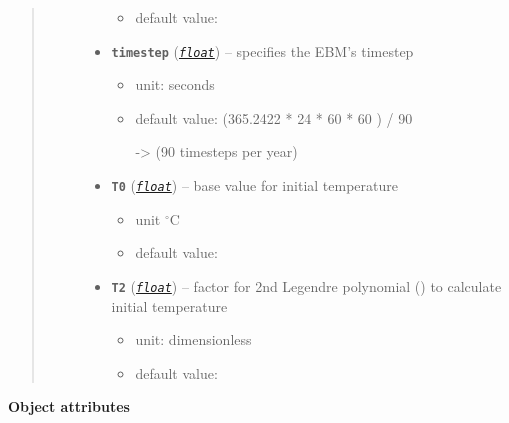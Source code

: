 \documentclass[a4paper,10pt,english]{sphinxmanual}
\begin{document}
\begin{fulllineitems}
\begin{quote}
\begin{description}
\begin{itemize}
\begin{itemize}
\item {} 
default value: 

\end{itemize}


\item {} 
\textbf{\texttt{timestep}} (\href{http://docs.python.org/2.7/library/functions.html\#float}{\emph{\texttt{float}}}) -- 
specifies the EBM's timestep
\begin{itemize}
\item {} 
unit: seconds

\item {} 
default value: (365.2422 * 24 * 60 * 60 ) / 90

-\textgreater{} (90 timesteps per year)

\end{itemize}


\item {} 
\textbf{\texttt{T0}} (\href{http://docs.python.org/2.7/library/functions.html\#float}{\emph{\texttt{float}}}) -- 
base value for initial temperature
\begin{itemize}
\item {} 
unit \(^{\circ} \textrm{C}\)

\item {} 
default value: 

\end{itemize}


\item {} 
\textbf{\texttt{T2}} (\href{http://docs.python.org/2.7/library/functions.html\#float}{\emph{\texttt{float}}}) -- 
factor for 2nd Legendre polynomial 
{\hyperref[api/climlab.utils:climlab.utils.legendre.P2]{\emph{}}} () 
to calculate initial temperature
\begin{itemize}
\item {} 
unit: dimensionless

\item {} 
default value: 

\end{itemize}


\end{itemize}

\end{description}\end{quote}

\textbf{Object attributes}


\end{fulllineitems}
\end{document}
